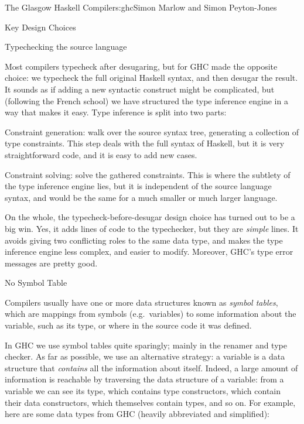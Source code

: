 \begin{aosachapter}{The Glasgow Haskell Compiler}{s:ghc}{Simon Marlow and Simon Peyton-Jones}
\begin{aosasect1}{Key Design Choices}
\begin{aosasect2}{Typechecking the source language}
\begin{aosaitemize}
\end{aosaitemize}

Most compilers typecheck after desugaring, but for GHC made the
opposite choice: we typecheck the full original Haskell syntax, and
then desugar the result.  It sounds as if adding a new syntactic
construct might be complicated, but (following the French school) we
have structured the type inference engine in a way that makes it
easy. Type inference is split into two parts:

\begin{aosaenumerate}

\item Constraint generation: walk over the source syntax tree,
  generating a collection of type constraints.  This step deals with
  the full syntax of Haskell, but it is very straightforward code, and
  it is easy to add new cases.

\item Constraint solving: solve the gathered constraints.  This is
  where the subtlety of the type inference engine lies, but it is
  independent of the source language syntax, and would be the same for
  a much smaller or much larger language.

\end{aosaenumerate}

On the whole, the typecheck-before-desugar design choice has turned
out to be a big win.  Yes, it adds lines of code to the typechecker,
but they are \emph{simple} lines. It avoids giving two conflicting
roles to the same data type, and makes the type inference engine less
complex, and easier to modify. Moreover, GHC's type error messages are
pretty good.

\end{aosasect2}

\begin{aosasect2}{No Symbol Table}

Compilers usually have one or more data structures known as
\emph{symbol tables}, which are mappings from symbols
(e.g.\ variables) to some information about the variable, such as its
type, or where in the source code it was defined.

In GHC we use symbol tables quite sparingly; mainly in the renamer and
type checker.  As far as possible, we use an alternative strategy: a
variable is a data structure that \emph{contains} all the information
about itself.  Indeed, a large amount of information is reachable by
traversing the data structure of a variable: from a variable we can
see its type, which contains type constructors, which contain their
data constructors, which themselves contain types, and so on.  For
example, here are some data types from GHC (heavily abbreviated and
simplified):


\end{aosasect2}
\end{aosasect1}
\end{aosachapter}
